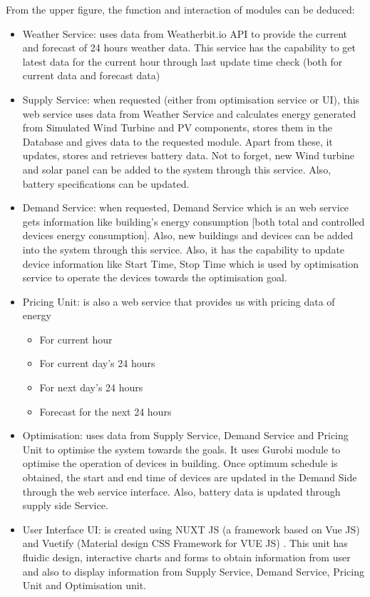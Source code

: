 \documentclass[runningheads]{llncs}
\begin{document}
From the upper figure, the function and interaction of modules can be deduced: 
\begin{itemize}
    \item Weather Service: uses data from Weatherbit.io API to provide the current and forecast of 24 hours weather data. This service has the capability to get latest data for the current hour through last update time check (both for current data and forecast data)
    \item Supply Service: when requested (either from optimisation service or UI), this web service uses data from Weather Service and calculates energy generated from Simulated Wind Turbine and PV components, stores them in the Database and gives data to the requested module. Apart from these, it updates, stores and retrieves battery data. Not to forget, new Wind turbine and solar panel can be added to the system through this service. Also, battery specifications can be updated.
    \item Demand Service: when requested, Demand Service which is an web service gets information like building's energy consumption [both total and controlled devices energy consumption]. Also, new buildings and devices can be added into the system through this service. Also, it has the capability to update device information like Start Time, Stop Time which is used by optimisation service to operate the devices towards the optimisation goal. 
    \item Pricing Unit: is also a web service that provides us with pricing data of energy 
    \begin{itemize}
        \item For current hour
        \item For current day's 24 hours
        \item For next day's 24 hours
        \item Forecast for the next 24 hours
    \end{itemize}
    \item Optimisation: uses data from Supply Service, Demand Service and Pricing Unit to optimise the system towards the goals. It uses Gurobi module to optimise the operation of devices in building. Once optimum schedule is obtained, the start and end time of devices are updated in the Demand Side through the web service interface. Also, battery data is updated through supply side Service.
    \item User Interface UI: is created using NUXT JS (a framework based on Vue JS) and Vuetify (Material design CSS Framework for VUE JS) \cite{Vuejs}. This unit has fluidic design, interactive charts and forms to obtain information from user and also to display information from Supply Service, Demand Service, Pricing Unit and Optimisation unit.
\end{itemize}
\end{document}

